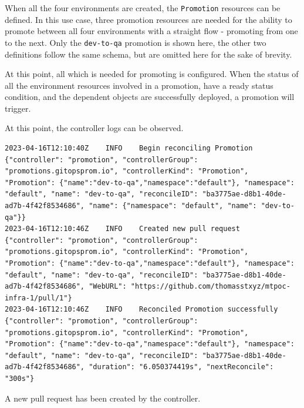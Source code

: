 When all the four environments are created, the \lstinline|Promotion| resources
can be defined.
In this use case, three promotion resources are needed for the ability to
promote between all four environments with a straight flow - promoting from one to the next.
Only the \lstinline|dev-to-qa| promotion is shown here,
the other two definitions follow the same schema,
but are omitted here for the sake of brevity.



%
%
%





At this point, all which is needed for promoting is configured.
When the status of all the environment resources involved in a promotion,
have a ready status condition,
and the dependent objects are successfully deployed,
a promotion will trigger.



At this point, the controller logs can be observed.

\begin{lstlisting}
2023-04-16T12:10:40Z    INFO    Begin reconciling Promotion     {"controller": "promotion", "controllerGroup": "promotions.gitopsprom.io", "controllerKind": "Promotion", "Promotion": {"name":"dev-to-qa","namespace":"default"}, "namespace": "default", "name": "dev-to-qa", "reconcileID": "ba3775ae-d8b1-40de-ad7b-4f42f8534686", "name": {"namespace": "default", "name": "dev-to-qa"}}
2023-04-16T12:10:46Z    INFO    Created new pull request        {"controller": "promotion", "controllerGroup": "promotions.gitopsprom.io", "controllerKind": "Promotion", "Promotion": {"name":"dev-to-qa","namespace":"default"}, "namespace": "default", "name": "dev-to-qa", "reconcileID": "ba3775ae-d8b1-40de-ad7b-4f42f8534686", "WebURL": "https://github.com/thomasstxyz/mtpoc-infra-1/pull/1"}
2023-04-16T12:10:46Z    INFO    Reconciled Promotion successfully       {"controller": "promotion", "controllerGroup": "promotions.gitopsprom.io", "controllerKind": "Promotion", "Promotion": {"name":"dev-to-qa","namespace":"default"}, "namespace": "default", "name": "dev-to-qa", "reconcileID": "ba3775ae-d8b1-40de-ad7b-4f42f8534686", "duration": "6.050374419s", "nextReconcile": "300s"}
\end{lstlisting}

A new pull request
has been created by the controller.

